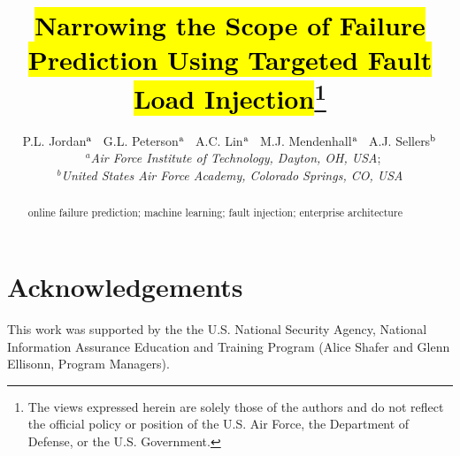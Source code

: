 \documentclass[]{tEIS2e}
\begin{document}

\title{\hl{Narrowing the Scope of Failure Prediction Using Targeted Fault Load
Injection}\footnote{The views expressed herein are solely those of the authors
and do not reflect the official policy or position of the U.S. Air Force, the
Department of Defense, or the U.S.  Government.}}


\author{P.L. Jordan$^{\rm a}$ \
        G.L. Peterson$^{\rm a}$ \
        A.C. Lin$^{\rm a}$ \
        M.J. Mendenhall$^{\rm a}$ \
        A.J. Sellers$^{\rm b}$ \\\vspace{6pt} \
        $^{a}${\em{Air Force Institute of Technology, Dayton, OH, USA}}; \\
        $^{b}${\em{United States Air Force Academy, Colorado Springs, CO, USA}}}
  
\maketitle

\begin{abstract}


\begin{keywords}
online failure prediction; machine learning; fault injection; enterprise
architecture
\end{keywords}

\clearpage

\end{abstract}


\section*{Acknowledgements}
This work was supported by the the U.S. National Security Agency, National
Information Assurance Education and Training Program (Alice Shafer and Glenn
Ellisonn, Program Managers).


 

\label{lastpage}
\end{document}
